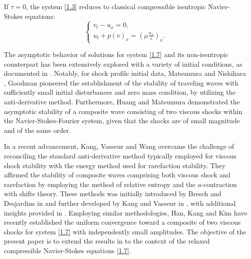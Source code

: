 \documentclass[10pt,reqno]{amsart}
\numberwithin{equation}{section}
\begin{document}


If $\tau=0$, the system \eqref{1.3} reduces to classical compressible isentropic Navier-Stokes equations:
\begin{equation}\label{1.7}
\begin{cases}
v_t-u_x=0,\\
u_t+p(v)_x=\left(\mu\frac{u_x}{v}\right)_x.
\end{cases}
\end{equation}

The asymptotic behavior of solutions for system \eqref{1.7} and its non-isentropic counterpart has been extensively explored with a variety of initial conditions, as documented in \cite{HH, SMJ, HLM, HM, WY, MNS, MNR1, MNR2}. Notably, for shock profile initial data, Matsumura and Nishihara \cite{MNS}, Goodman \cite{GD} pioneered the establishment of the stability of traveling waves with sufficiently small initial disturbances and zero mass condition, by utilizing the anti-derivative method. Furthermore, Huang and Matsumura \cite{HM} demonstrated the asymptotic stability of a composite wave consisting of two viscous shocks within the Navier-Stokes-Fourier system, given that the shocks are of small magnitude and of the same order.

In a recent advancement, Kang, Vasseur and Wang \cite{WY} overcame the challenge of reconciling the standard anti-derivative method typically employed for viscous shock stability with the energy method used for rarefaction stability. They affirmed the stability of composite waves comprising both viscous shock and rarefaction by employing the method of relative entropy and the $a$-contraction with shifts theory. These methods was initially introduced by  Bresch and Desjardins in \cite{BD} and further developed by Kang and Vasseur in \cite{KV1, KV3, KV6, KV10}, with additional insights provided in \cite{KV8, KV11, KV2, V28}. Employing similar methodologies, Han, Kang and Kim \cite{SMJ}  have recently established the uniform convergence toward a composite of two viscous shocks for system \eqref{1.7} with independently small amplitudes. The objective of the present paper is to extend the results in \cite{SMJ} to the context of the relaxed compressible Navier-Stokes equations \eqref{1.7}.
\end{document}
